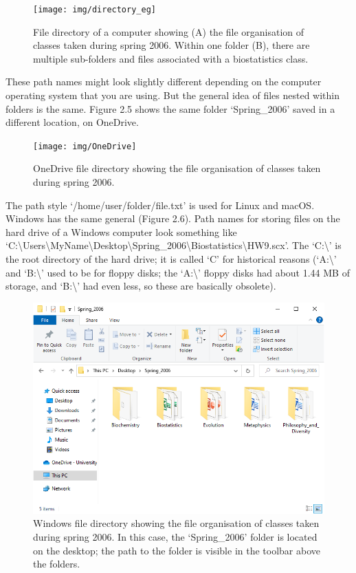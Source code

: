 \documentclass[
  openany]{krantz}
\begin{document}
\begin{figure}
\texttt{[image: img/directory\_eg]} \caption{File directory of a computer showing (A) the file organisation of classes taken during spring 2006. Within one folder (B), there are multiple sub-folders and files associated with a biostatistics class.}\label{fig:unnamed-chunk-7}
\end{figure}

These path names might look slightly different depending on the computer operating system that you are using.
But the general idea of files nested within folders is the same.
Figure 2.5 shows the same folder `Spring\_2006' saved in a different location, on OneDrive.

\begin{figure}
\texttt{[image: img/OneDrive]} \caption{OneDrive file directory showing the file organisation of classes taken during spring 2006.}\label{fig:unnamed-chunk-8}
\end{figure}

The path style `/home/user/folder/file.txt' is used for Linux and macOS.
Windows has the same general  (Figure 2.6).
Path names for storing files on the hard drive of a Windows computer look something like `C:\textbackslash Users\textbackslash MyName\textbackslash Desktop\textbackslash Spring\_2006\textbackslash Biostatistics\textbackslash HW9.scx'.
The `C:\textbackslash{}' is the root directory of the hard drive; it is called `C' for historical reasons (`A:\textbackslash{}' and `B:\textbackslash{}' used to be for floppy disks; the `A:\textbackslash{}' floppy disks had about 1.44 MB of storage, and `B:\textbackslash{}' had even less, so these are basically obsolete).

\begin{figure}
\includegraphics[width=1\linewidth]{img/directory_windows} \caption{Windows file directory showing the file organisation of classes taken during spring 2006. In this case, the `Spring\_2006' folder is located on the desktop; the path to the folder is visible in the toolbar above the folders.}\label{fig:unnamed-chunk-9}
\end{figure}
\end{document}
